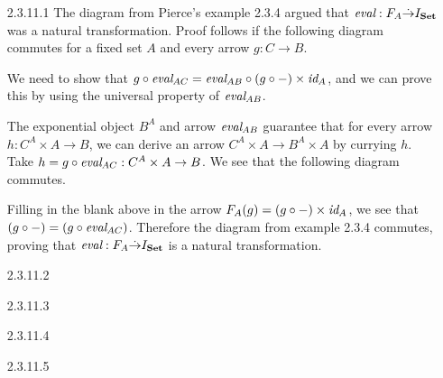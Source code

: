 \documentclass{article}
\newcommand{\id}{\emph{id}}
\newcommand{\cset}{\mathbf{Set}}
\newcommand{\eval}{\emph{eval}}
\newcommand{\curry}{\emph{curry}}
\newcommand{\natarrow}{\dot{\rightarrow}}
\begin{document}
\begin{enumerate}
\item [2.3.11.1]
  The diagram from Pierce's example 2.3.4 argued that $\eval : F_A \natarrow I_\cset$ was a natural transformation.
  Proof follows if the following diagram commutes for a fixed set $A$ and every arrow $g : C \rightarrow B$.
  \begin{center}
  \end{center}
  We need to show that $g \circ \eval_{AC} = \eval_{AB} \circ (g\circ -) \times \id_A$, and we can prove this by using the universal property of $\eval_{AB}$.
  
  The exponential object $B^A$ and arrow $\eval_{AB}$ guarantee that for every arrow $h : C^A \times A \rightarrow B$, we can derive an arrow $C^A \times A \rightarrow B^A \times A$ by currying $h$.
  Take $h = g \circ \eval_{AC} : C^A \times A \rightarrow B$.
  We see that the following diagram commutes.
  \begin{center}
  \end{center}
  Filling in the blank above in the arrow $F_A(g) = (g \circ -) \times \id_A$, we see that $(g \circ -) = (g \circ \eval_{AC})$.
  Therefore the diagram from example 2.3.4 commutes, proving that $\eval : F_A \natarrow I_\cset$ is a natural transformation.
\newpage

\item [2.3.11.2]
\item [2.3.11.3]
\item [2.3.11.4]
\item [2.3.11.5]
\end{enumerate}
\end{document}
